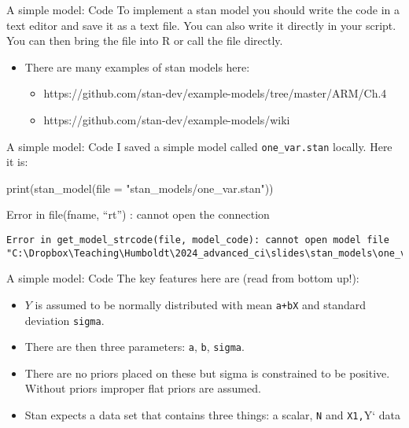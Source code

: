 \documentclass[
  11pt,
  ignorenonframetext,
]{beamer}
\newenvironment{Shaded}{\begin{snugshade}}{\end{snugshade}}
\newcommand{\AttributeTok}[1]{\textcolor[rgb]{0.40,0.45,0.13}{#1}}
\newcommand{\FunctionTok}[1]{\textcolor[rgb]{0.28,0.35,0.67}{#1}}
\newcommand{\NormalTok}[1]{\textcolor[rgb]{0.00,0.23,0.31}{#1}}
\newcommand{\StringTok}[1]{\textcolor[rgb]{0.13,0.47,0.30}{#1}}
\providecommand{\tightlist}{%
  \setlength{\itemsep}{0pt}\setlength{\parskip}{0pt}}\usepackage{longtable,booktabs,array}
\begin{document}
\begin{frame}{A simple model: Code}
\protect\hypertarget{a-simple-model-code-3}{}
To implement a stan model you should write the code in a text editor and
save it as a text file. You can also write it directly in your script.
You can then bring the file into R or call the file directly.

\begin{itemize}
\tightlist
\item
  There are many examples of stan models here:

  \begin{itemize}
  \tightlist
  \item
    https://github.com/stan-dev/example-models/tree/master/ARM/Ch.4
  \item
    https://github.com/stan-dev/example-models/wiki
  \end{itemize}
\end{itemize}
\end{frame}

\begin{frame}[fragile]{A simple model: Code}
\protect\hypertarget{a-simple-model-code-4}{}
I saved a simple model called \texttt{one\_var.stan} locally. Here it
is:

\begin{Shaded}
\begin{Highlighting}[]
\FunctionTok{print}\NormalTok{(}\FunctionTok{stan\_model}\NormalTok{(}\AttributeTok{file =} \StringTok{"stan\_models/one\_var.stan"}\NormalTok{))}
\end{Highlighting}
\end{Shaded}

Error in file(fname, ``rt'') : cannot open the connection

\begin{verbatim}
Error in get_model_strcode(file, model_code): cannot open model file "C:\Dropbox\Teaching\Humboldt\2024_advanced_ci\slides\stan_models\one_var.stan"
\end{verbatim}
\end{frame}

\begin{frame}[fragile]{A simple model: Code}
\protect\hypertarget{a-simple-model-code-5}{}
The key features here are (read from bottom up!):

\begin{itemize}
\tightlist
\item
  \(Y\) is assumed to be normally distributed with mean \texttt{a+bX}
  and standard deviation \texttt{sigma}.
\item
  There are then three parameters: \texttt{a}, \texttt{b},
  \texttt{sigma}.
\item
  There are no priors placed on these but sigma is constrained to be
  positive. Without priors improper flat priors are assumed.
\item
  Stan expects a data set that contains three things: a scalar,
  \texttt{N} and \texttt{X1,}Y` data
\end{itemize}
\end{frame}
\end{document}
